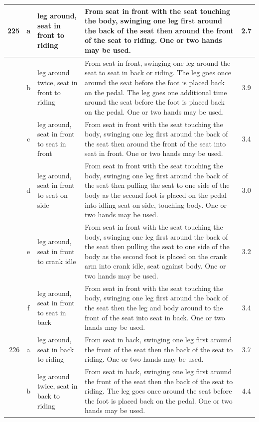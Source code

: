 \begin{longtable}{|r|c|p{4cm}|p{8cm}|c|}
\hline
225 & a & leg around, seat in front to riding & From seat in front with the seat touching the body, swinging one leg first around the back of the seat then around the front of the seat to riding. One or two hands may be used. & 2.7 \\ 
\hline
  & b & leg around twice, seat in front to riding & From seat in front, swinging one leg around the seat to seat in back or riding. The leg goes once around the seat before the foot is placed back on the pedal. The leg goes one additional time around the seat before the foot is placed back on the pedal. One or two hands may be used.  & 3.9 \\ 
\hline
  & c & leg around, seat in front to seat in front  & From seat in front with the seat touching the body, swinging one leg first around the back of the seat then around the front of the seat into seat in front. One or two hands may be used.  & 3.4 \\ 
\hline
  & d & leg around, seat in front to seat on side & From seat in front with the seat touching the body, swinging one leg first around the back of the seat then pulling the seat to one side of the body as the second foot is placed on the pedal into idling seat on side, touching body. One or two hands may be used. & 3.0 \\ 
\hline
  & e & leg around, seat in front to crank idle & From seat in front with the seat touching the body, swinging one leg first around the back of the seat then pulling the seat to one side of the body as the second foot is placed on the crank arm into crank idle, seat against body. One or two hands may be used.  & 3.2 \\ 
\hline
  & f & leg around, seat in front to seat in back & From seat in front with the seat touching the body, swinging one leg first around the back of the seat then the leg and body around to the front of the seat into seat in back. One or two hands may be used. & 3.4 \\ 
\hline
226 & a & leg around, seat in back to riding  & From seat in back, swinging one leg first around the front of the seat then the back of the seat to riding. One or two hands may be used. & 3.7 \\ 
\hline
  & b & leg around twice, seat in back to riding  & From seat in back, swinging one leg first around the front of the seat then the back of the seat to riding. The leg goes once around the seat before the foot is placed back on the pedal. One or two hands may be used.  & 4.4 \\ 

\end{longtable}
